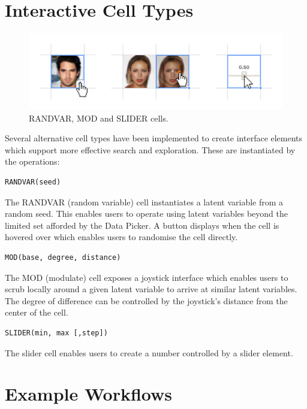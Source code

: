 \documentclass[letterpaper]{article}
\begin{document}
\section*{Interactive Cell Types}

\begin{figure}[ht!]
  \centering
  \includegraphics[width=12cm]{figs/03-cell-types.jpg}
  \caption{RANDVAR, MOD and SLIDER cells.}
\end{figure}

Several alternative cell types have been implemented to create interface elements which support more effective search and exploration. These are instantiated by the operations:

\begin{verbatim}
RANDVAR(seed)
\end{verbatim}
The RANDVAR (random variable) cell instantiates a latent variable from a random seed. This enables users to operate using latent variables beyond the limited set afforded by the Data Picker. A button displays when the cell is hovered over which enables users to randomise the cell directly.

\begin{verbatim}
MOD(base, degree, distance)
\end{verbatim}
The MOD (modulate) cell exposes a joystick interface which enables users to scrub locally around a given latent variable to arrive at similar latent variables. The degree of difference can be controlled by the joystick’s distance from the center of the cell.

\begin{verbatim}
SLIDER(min, max [,step])
\end{verbatim}
The slider cell enables users to create a number controlled by a slider element.

\newpage 
\section*{Example Workflows}

\setcounter{secnumdepth}{0}
\end{document}
